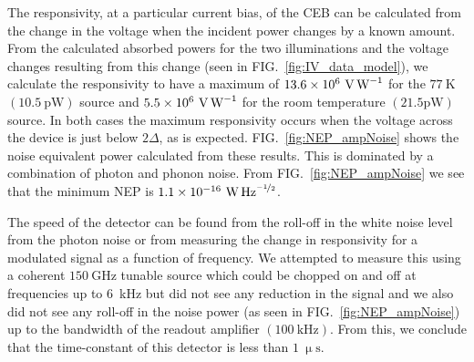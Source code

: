 \documentclass[aip, apl, a4paper, amsmath,amssymb, reprint]{revtex4-1}
\begin{document}
The responsivity, at a particular current bias, of the CEB can be calculated from the change in the voltage when the incident power changes by a known amount. From the calculated absorbed powers for the two illuminations and the voltage changes resulting from this change (seen in  FIG.~\ref{fig:IV_data_model}), we calculate the responsivity to have a maximum of $13.6 \times 10^{6}~\mathrm{\mbox{V\,W}^{-1}}$ for the $77~\mathrm{K}$ $(10.5~\mathrm{pW})$ source and $5.5 \times 10^{6}~\mathrm{\mbox{V\,W}^{-1}}$ for the room temperature $(21.5\mathrm{pW})$ source. In both cases the maximum responsivity occurs when the voltage across the device is just below $2\Delta$, as is expected. FIG.~\ref{fig:NEP_ampNoise} shows the noise equivalent power calculated from these results. This is dominated by a combination of photon and phonon noise. From FIG.~\ref{fig:NEP_ampNoise} we see that the minimum NEP is $1.1 \times 10^{-16}~\mathrm{\mbox{W\,Hz}^{\nicefrac{-1}{2}}}$.

The speed of the detector can be found from the roll-off in the white noise level from the photon noise or from measuring the change in responsivity for a modulated signal as a function of frequency. We attempted to measure this using a coherent $150~\mathrm{GHz}$ tunable source which could be chopped on and off at frequencies up to 6~kHz but did not see any reduction in the signal and we also did not see any roll-off in the noise power (as seen in FIG.~\ref{fig:NEP_ampNoise}) up to the bandwidth of the readout amplifier $\left(100~\mathrm{kHz}\right)$. From this, we conclude that the time-constant of this detector is less than $1~\mathrm{\upmu s}$.
\end{document}
